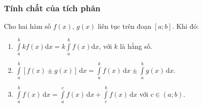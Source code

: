 \subsubsection{Tính chất của tích phân}
Cho hai hàm số $f(x)$, $g(x)$ liên tục trên đoạn $\left[a;b\right]$. Khi đó:
\begin{enumerate}
	\item $\int\limits_a^bkf(x)\mathrm{d}x=k\int\limits_a^bf(x)\mathrm{d}x$, với $k$ là hằng số.
	\item $\int\limits_a^b\left[f(x)\pm g(x)\right]\mathrm{\,d}x=\int\limits_a^b{f(x)\mathrm{\,d}x}\pm\int\limits_a^bg(x)\mathrm{\,d}x$.
	\item $\int\limits_a^bf(x)\mathrm{\,d}x=\int\limits_a^cf(x)\mathrm{\,d}x+\int\limits_c^bf(x)\mathrm{\,d}x$ với $c\in\left(a;b\right)$.
\end{enumerate}
